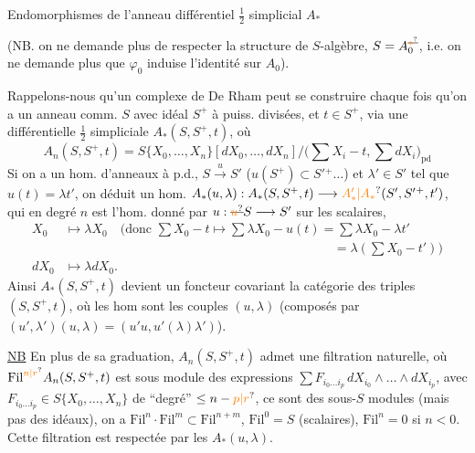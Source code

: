 Endomorphismes de l'anneau différentiel $\frac12$ simplicial $A_{\ast}$

(NB. on ne demande plus de respecter la structure de $S$-algèbre, $S=A_0^{\deleted{\unsure{*}}}$, i.e. on ne demande plus que $\varphi_0$ induise l'identité sur $A_0$).

Rappelons-nous qu'un complexe de De Rham peut se construire chaque fois qu'on a un anneau comm. $S$ avec idéal $S^+$ à puiss. divisées, et
$t\in S^+$, via une   différentielle  $\frac12$ simpliciale $A_\ast(S,S^+,t)$, où
\[
A_n(S,S^+,t)=S\{X_0,\ldots,X_n\}[dX_0,\ldots,dX_n]\big/\bigl(\textstyle\sum X_i-t,\sum dX_i\bigr)_{\mathrm{pd}}
\]
Si on a un hom. d'anneaux à p.d., $S\xrightarrow{u} S'$ ($u(S^+)\subset S'{}^+\ldots$) et $\lambda'\in S'$ tel que
 $u(t)=\lambda t'$, on  déduit un hom. 
$A_\ast(u,\lambda): A_\ast(S,S^+,t)\longrightarrow \unsure{A'_\ast|A_\ast}(S',S'{}^+,t')$, qui en degré $n$ est l'hom.
donné par  $u:\deleted{\unsure{u}}S\longrightarrow S'$ sur les scalaires,
\[
\begin{aligned}
X_0&\longmapsto\lambda X_0\quad\bigl(\text{donc }\textstyle\sum X_0-t\longmapsto\sum\lambda X_0-u(t)=\sum\lambda X_{0}-\lambda t'\\[-2pt]
&\hspace{21em}=\lambda(\textstyle\sum X_0-t')\bigr)\\
dX_0&\longmapsto\lambda dX_0.
\end{aligned}
\]
Ainsi $A_\ast(S,S^+,t)$ devient un foncteur covariant  la catégorie des triples $(S,S^+,t)$, où les hom sont les couples $(u,\lambda)$  (composés par $(u',\lambda')(u,\lambda)=(u'u,u'(\lambda)\lambda')$).

\uline{NB} En plus de sa graduation, $A_n(S,S^+,t)$ admet une filtration  naturelle, où $\mathrm{Fil}^{\unsure{n|r}}A_n(S,S^+,t)$ est  sous
module des expressions $\sum F_{i_0\ldots i_p}\,dX_{i_0}\wedge\ldots\wedge dX_{i_p}$, avec $F_{i_0\ldots i_p}\in S\{X_0,\ldots,X_n\}$  de ``degré'' $\leq n-\unsure{p|r}$, ce sont des sous-$S$ modules (mais pas des idéaux), on
a $\mathrm{Fil}^n\cdot\mathrm{Fil}^m\subset\mathrm{Fil}^{n+m}$, $\mathrm{Fil}^0=S$ (scalaires), $\mathrm{Fil}^n=0$ si $n<0$. Cette filtration est respectée par les $A_\ast(u,\lambda)$.

